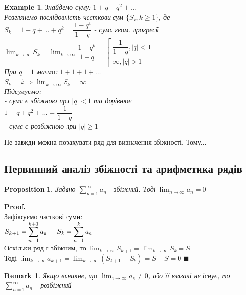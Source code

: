 \documentclass[a4paper, 14pt]{extarticle}
\def\huge{\displaystyle}
\theoremstyle{theoremdd}
\theoremstyle{theoremdd}
\theoremstyle{theoremdd}
\theoremstyle{theoremdd}
\newtheorem{example}[theorem]{Example}
\theoremstyle{theoremdd}
\newtheorem{proposition}[theorem]{Proposition}
\theoremstyle{theoremdd}
\newtheorem{remark}[theorem]{Remark}
\theoremstyle{theoremdd}
\theoremstyle{theoremdd}
\newenvironment{pf}{\vspace*{-3mm} \textbf{Proof. \\}}{$\blacksquare$}
\begin{document}
\begin{example}
Знайдемо суму: $1 + q + q^2 + \dots$\\
Розглянемо послідовність часткови сум $\{S_k, k \geq 1\}$, де \\ $S_k = 1 + q + \dots + q^k = \dfrac{1 - q^k}{1 - q}$ - сума геом. прогресії\\
$\huge \lim_{k \to \infty} S_k = \lim_{k \to \infty} \dfrac{1-q^k}{1 - q} = \left[ \begin{gathered} \dfrac{1}{1-q}, |q|<1 \\ \infty, |q|>1 \end{gathered} \right.$
\\
При $q = 1$ маємо: $1 + 1 + 1 + \dots$\\
$S_k = k \Rightarrow \huge \lim_{k \to \infty} S_k = \infty$\\
Підсумуємо:\\
- сума є збіжною при $|q| < 1$ та дорівнює\\
$1 + q + q^2 + \dots = \dfrac{1}{1-q}$\\
- сума є розбіжною при $|q| \geq 1$
\end{example}
Не завжди можна порахувати ряд для визначення збіжності. Тому...

\subsection{Первинний аналіз збіжності та арифметика рядів}
\begin{proposition}
Задано $\huge \sum_{n=1}^{\infty} a_n$ - збіжний. Тоді $\huge \lim_{n \to \infty} a_n = 0$
\end{proposition}

\begin{pf}
Зафіксуємо часткові суми:\\
$\huge S_{k+1} = \sum_{n=1}^{k+1} a_n \hspace{0.5cm} S_{k} = \sum_{n=1}^{k} a_n$\\
Оскільки ряд є збіжним, то $\huge \lim_{k \to \infty} S_{k+1} = \lim_{k \to \infty} S_k = S$\\
Тоді $\huge \lim_{k \to \infty} a_{k+1} = \lim_{k \to \infty} (S_{k+1} - S_k) = S - S = 0$
\end{pf}

\begin{remark}
Якщо виникне, що $\huge\lim_{n \to \infty} a_n \neq 0$, або її взагалі не існує, то $\huge \sum_{n=1}^{\infty} a_n$ - розбіжний
\end{remark}
\end{document}
